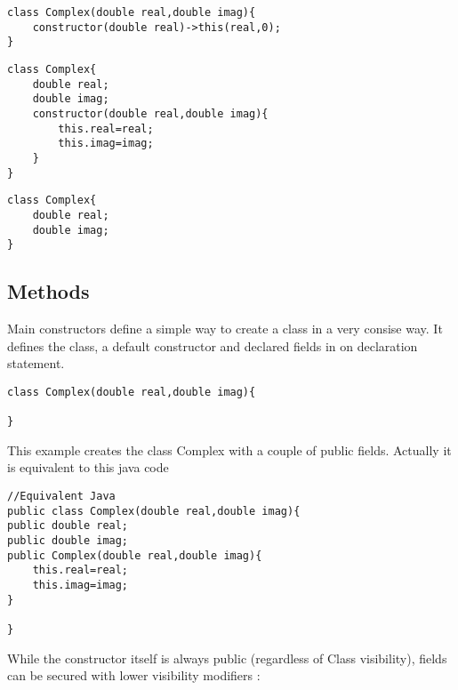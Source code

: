 \documentclass{tufte-book}
\begin{document}
            \begin{lstlisting}
class Complex(double real,double imag){
    constructor(double real)->this(real,0);
}
            \end{lstlisting}

            \begin{lstlisting}
class Complex{
    double real;
    double imag;
    constructor(double real,double imag){
        this.real=real;
        this.imag=imag;
    }
}    
            \end{lstlisting}

            \begin{lstlisting}
class Complex{
    double real;
    double imag;
}
            \end{lstlisting}





            \subsection{Methods}


            Main constructors define a simple way to create a class in a very consise way. It defines the class, a default  constructor and  declared fields in on declaration statement.
            \begin{lstlisting}
class Complex(double real,double imag){

}
            \end{lstlisting}

            This example creates the class Complex with a couple of public fields. Actually it is equivalent to this java code

            \begin{lstlisting}
//Equivalent Java
public class Complex(double real,double imag){
public double real;
public double imag;
public Complex(double real,double imag){
    this.real=real;
    this.imag=imag;
}

}
            \end{lstlisting}


            While the constructor itself is always public (regardless of Class visibility), fields can be secured with lower visibility modifiers :
\end{document}
